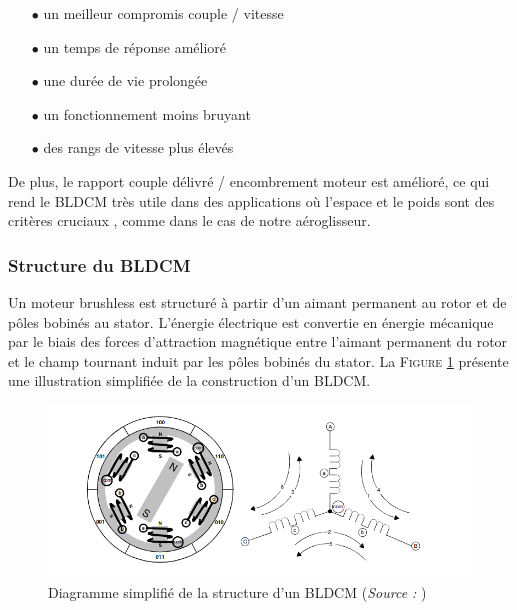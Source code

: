 \documentclass[a4paper,12pt]{report}
\begin{document}
			\begin{itemize}
				\item[$\bullet$] un meilleur compromis couple / vitesse 
				\item[$\bullet$] un temps de réponse amélioré
				\item[$\bullet$] une durée de vie prolongée
				\item[$\bullet$] un fonctionnement moins bruyant
				\item[$\bullet$] des rangs de vitesse plus élevés
			\end{itemize}
			
			De plus, le rapport couple délivré / encombrement moteur est amélioré, ce qui rend le BLDCM très utile dans des applications où l'espace et le poids sont des critères cruciaux \cite{AN885}, comme dans le cas de notre aéroglisseur.
			
			\vspace{-1em}
			
				\subsubsection{Structure du BLDCM}
				
				\vspace{-1.5em}
				
				 Un moteur brushless est structuré à partir d'un aimant permanent au rotor et de pôles bobinés au stator. L'énergie électrique est convertie en énergie mécanique par le biais des forces d'attraction magnétique entre l'aimant permanent du rotor et le champ tournant induit par les pôles bobinés du stator. La \textsc{Figure \ref{struct_bldcm}} présente une illustration simplifiée de la construction d'un BLDCM. 
				 
				 \begin{figure}
				 	\begin{center}
				 		\includegraphics[scale=0.7]{../Illus/struct_bldcm.png}
				 	\end{center}
				 	\caption{Diagramme simplifié de la structure d'un BLDCM (\textit{Source :} \cite{AN857})}
				 	\label{struct_bldcm}
				 \end{figure}
				 
\end{document}
